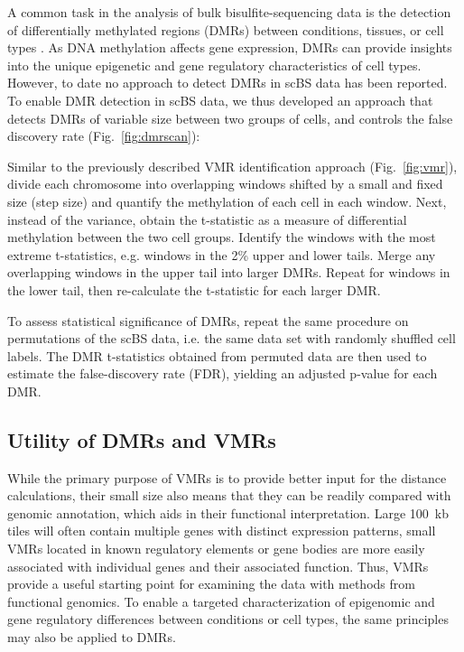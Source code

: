 \documentclass[twocolumn,10pt]{article}
\begin{document}
A common task in the analysis of bulk bisulfite-sequencing data is the detection of differentially methylated regions (DMRs) between conditions, tissues, or cell types \citep{Hebestreit2013, dmrseq}.
As DNA methylation affects gene expression, DMRs can provide insights into the unique epigenetic and gene regulatory characteristics of cell types.
However, to date no approach to detect DMRs in scBS data has been reported.
To enable DMR detection in scBS data, we thus developed an approach that detects DMRs of variable size between two groups of cells, and controls the false discovery rate (Fig.~\ref{fig:dmrscan}):

Similar to the previously described VMR identification approach (Fig.~\ref{fig:vmr}), divide each chromosome into overlapping windows shifted by a small and fixed size (step size) and quantify the methylation of each cell in each window.
Next, instead of the variance, obtain the t-statistic %
as a measure of differential methylation between the two cell groups.
Identify the windows with the most extreme t-statistics, e.g. windows in the 2\% upper and lower tails.
Merge any overlapping windows in the upper tail into larger DMRs.
Repeat for windows in the lower tail, then re-calculate the t-statistic for each larger DMR.

To assess statistical significance of DMRs, repeat the same procedure on permutations of the scBS data, i.e. the same data set with randomly shuffled cell labels.
The DMR t-statistics obtained from permuted data are then used to estimate the false-discovery rate (FDR), yielding an adjusted p-value for each DMR.

\subsection{Utility of DMRs and VMRs} %

While the primary purpose of VMRs is to provide better input for the distance calculations, their small size also means that they can be readily compared with genomic annotation, which aids in their functional interpretation.
Large 100~kb tiles will often contain multiple genes with distinct expression patterns, small VMRs located in known regulatory elements or gene bodies are more easily associated with individual genes and their associated function.
Thus, VMRs provide a useful starting point for examining the data with methods from functional genomics.
To enable a targeted characterization of epigenomic and gene regulatory differences between conditions or cell types, the same principles may also be applied to DMRs.
\end{document}
